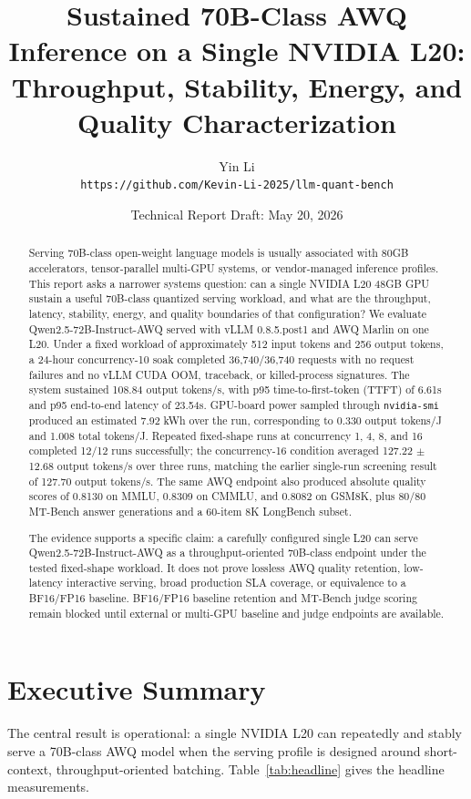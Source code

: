 \documentclass[11pt]{article}
\title{Sustained 70B-Class AWQ Inference on a Single NVIDIA L20:\\
Throughput, Stability, Energy, and Quality Characterization}
\author{
Yin Li\\
\texttt{https://github.com/Kevin-Li-2025/llm-quant-bench}
}
\date{Technical Report Draft: May 20, 2026}
\newcommand{\qwenawq}{Qwen2.5\nobreakdash-72B\nobreakdash-Instruct\nobreakdash-AWQ}
\begin{document}
\maketitle

\begin{abstract}
Serving 70B-class open-weight language models is usually associated with
80GB accelerators, tensor-parallel multi-GPU systems, or vendor-managed
inference profiles. This report asks a narrower systems question: can a single
NVIDIA L20 48GB GPU sustain a useful 70B-class quantized serving workload, and
what are the throughput, latency, stability, energy, and quality boundaries of
that configuration? We evaluate \qwenawq{} served with vLLM
0.8.5.post1 and AWQ Marlin on one L20. Under a fixed workload of approximately
512 input tokens and 256 output tokens, a 24-hour concurrency-10 soak completed
36,740/36,740 requests with no request failures and no vLLM CUDA OOM, traceback,
or killed-process signatures. The system sustained 108.84 output tokens/s, with
p95 time-to-first-token (TTFT) of 6.61s and p95 end-to-end latency of 23.54s.
GPU-board power sampled through \texttt{nvidia-smi} produced an estimated
7.92 kWh over the run, corresponding to 0.330 output tokens/J and 1.008 total
tokens/J. Repeated fixed-shape runs at concurrency 1, 4, 8, and 16 completed
12/12 runs successfully; the concurrency-16 condition averaged
127.22 $\pm$ 12.68 output tokens/s over three runs, matching the earlier
single-run screening result of 127.70 output tokens/s. The same AWQ endpoint
also produced absolute quality scores of 0.8130 on MMLU, 0.8309 on CMMLU, and
0.8082 on GSM8K, plus 80/80 MT-Bench answer generations and a 60-item 8K
LongBench subset.

The evidence supports a specific claim: a carefully configured single L20 can
serve \qwenawq{} as a throughput-oriented 70B-class endpoint under
the tested fixed-shape workload. It does not prove lossless AWQ quality
retention, low-latency interactive serving, broad production SLA coverage, or
equivalence to a BF16/FP16 baseline. BF16/FP16 baseline retention and MT-Bench
judge scoring remain blocked until external or multi-GPU baseline and judge
endpoints are available.
\end{abstract}

\section{Executive Summary}

The central result is operational: a single NVIDIA L20 can repeatedly and
stably serve a 70B-class AWQ model when the serving profile is designed around
short-context, throughput-oriented batching. Table~\ref{tab:headline} gives the
headline measurements.
\end{document}
